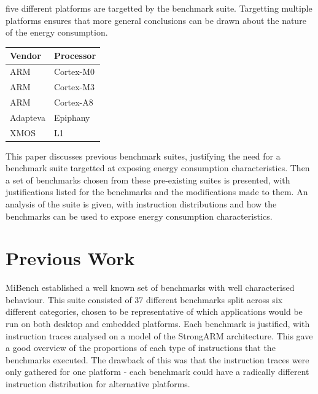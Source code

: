\documentclass[twocolumn]{article}
\begin{document}
five different platforms are targetted by the benchmark suite. Targetting multiple platforms ensures that more general conclusions can be drawn about the nature of the energy consumption.

\begin{center}
	\begin{tabular}{l l}
		Vendor  & Processor \\
		\hline
		ARM		& Cortex-M0 \\
		ARM		& Cortex-M3 \\
		ARM 	& Cortex-A8 \\
		Adapteva& Epiphany \\
		XMOS	& L1 \\
	\end{tabular}
\end{center}

This paper discusses previous benchmark suites, justifying the need for a benchmark suite targetted at exposing energy consumption characteristics. Then a set of benchmarks chosen from these pre-existing suites is presented, with justifications listed for the benchmarks and the modifications made to them. An analysis of the suite is given, with instruction distributions and how the benchmarks can be used to expose energy consumption characteristics.

\section{Previous Work}

MiBench established a well known set of benchmarks with well characterised behaviour. This suite consisted of 37 different benchmarks split across six different categories, chosen to be representative of which applications would be run on both desktop and embedded platforms. Each benchmark is justified, with instruction traces analysed on a model of the StrongARM architecture. This gave a good overview of the proportions of each type of instructions that the benchmarks executed. The drawback of this was that the instruction traces were only gathered for one platform - each benchmark could have a radically different instruction distribution for alternative platforms.
\end{document}
